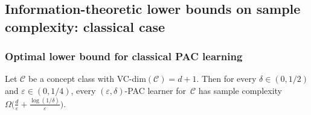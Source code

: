 \documentclass[twoside,11pt]{article}
\newcommand{\eps}{\varepsilon}
\newcommand{\C}{\ensuremath{\mathscr{C}}}
\begin{document}
\subsection{Information-theoretic lower bounds on sample complexity: classical case}
\label{section:infortheoreticlowerboundsclassical}

\subsubsection{Optimal lower bound for  classical PAC learning}

\begin{theorem}\label{thm:infoclassicalpac}
	Let $\C$ be a concept class with VC-dim$(\C)=d+1$. Then for every $\delta\in (0,1/2)$ and $\eps \in (0,1/4)$, every $(\eps,\delta)$-PAC learner for~$\C$ has sample complexity 
	$\Omega\Big(\frac{d}{\eps} + \frac{\log(1/\delta)}{\eps}\Big)$.
\end{theorem}
\end{document}
